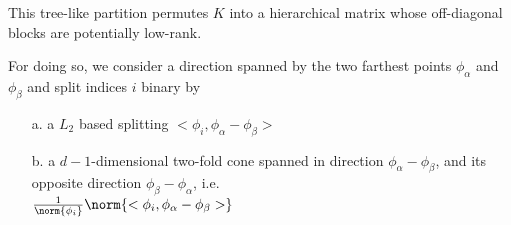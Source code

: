 This tree-like partition permutes $K$ into a hierarchical matrix whose off-diagonal blocks are potentially low-rank.

For doing so, we consider a direction spanned by the two farthest points $\phi_\alpha$ and $\phi_\beta$ and split indices $i$ binary by
\begin{itemize}
\item[a.] a $L_2$ based splitting $<\phi_i,\phi_\alpha-\phi_\beta>$
\item[b.] a $d-1$-dimensional two-fold cone spanned in direction $\phi_\alpha-\phi_\beta$, and its opposite direction $\phi_\beta-\phi_\alpha$, i.e. \\ $\frac{1}{\norm{\phi_i}}\norm{<\phi_i,\phi_\alpha-\phi_\beta>}$
\end{itemize}

